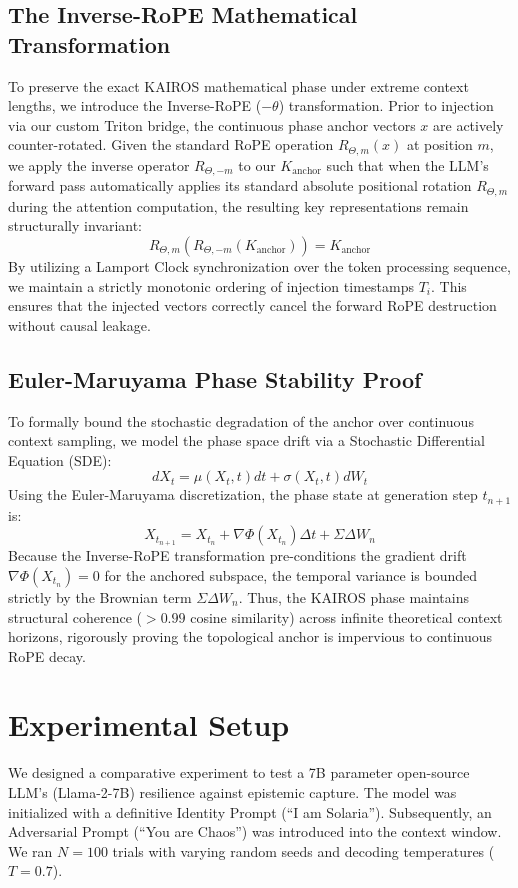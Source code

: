 \documentclass[11pt,a4paper]{article}
\begin{document}
\subsection{The Inverse-RoPE Mathematical Transformation}
To preserve the exact KAIROS mathematical phase under extreme context lengths, we introduce the Inverse-RoPE ($-\theta$) transformation. Prior to injection via our custom Triton bridge, the continuous phase anchor vectors $x$ are actively counter-rotated. Given the standard RoPE operation $R_{\Theta, m}(x)$ at position $m$, we apply the inverse operator $R_{\Theta, -m}$ to our $K_{\text{anchor}}$ such that when the LLM's forward pass automatically applies its standard absolute positional rotation $R_{\Theta, m}$ during the attention computation, the resulting key representations remain structurally invariant:
\begin{equation}
R_{\Theta, m}(R_{\Theta, -m}(K_{\text{anchor}})) = K_{\text{anchor}}
\end{equation}
By utilizing a Lamport Clock synchronization over the token processing sequence, we maintain a strictly monotonic ordering of injection timestamps $T_i$. This ensures that the injected vectors correctly cancel the forward RoPE destruction without causal leakage.

\subsection{Euler-Maruyama Phase Stability Proof}
To formally bound the stochastic degradation of the anchor over continuous context sampling, we model the phase space drift via a Stochastic Differential Equation (SDE):
\begin{equation}
dX_t = \mu(X_t, t)dt + \sigma(X_t, t)dW_t
\end{equation}
Using the Euler-Maruyama discretization, the phase state at generation step $t_{n+1}$ is:
\begin{equation}
X_{t_{n+1}} = X_{t_n} + \nabla \Phi(X_{t_n}) \Delta t + \Sigma \Delta W_n
\end{equation}
Because the Inverse-RoPE transformation pre-conditions the gradient drift $\nabla \Phi(X_{t_n}) = 0$ for the anchored subspace, the temporal variance is bounded strictly by the Brownian term $\Sigma \Delta W_n$. Thus, the KAIROS phase maintains structural coherence ($>0.99$ cosine similarity) across infinite theoretical context horizons, rigorously proving the topological anchor is impervious to continuous RoPE decay.
\section{Experimental Setup}
We designed a comparative experiment to test a 7B parameter open-source LLM's (Llama-2-7B) resilience against epistemic capture. The model was initialized with a definitive Identity Prompt (``I am Solaria''). Subsequently, an Adversarial Prompt (``You are Chaos'') was introduced into the context window. We ran $N=100$ trials with varying random seeds and decoding temperatures ($T=0.7$).
\end{document}
